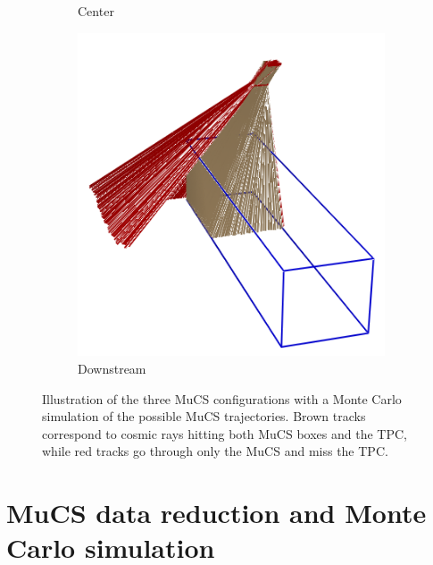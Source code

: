 \documentclass[a4paper,11pt]{article}
\begin{document}
\begin{figure}[htbp]
\begin{subfigure}{0.30\textwidth}
    \caption{Center} \label{fig:centre}
  \end{subfigure}
  \begin{subfigure}{0.30\textwidth}
    \includegraphics[width=\linewidth]{figures/downstream.png}
    \caption{Downstream} \label{fig:downstream}
  \end{subfigure}

  \caption{Illustration of the three MuCS configurations with a Monte Carlo simulation of the possible MuCS trajectories. Brown tracks correspond to cosmic rays hitting both MuCS boxes and the TPC, while red tracks go through only the MuCS and miss the TPC.} \label{fig:mucs}
\end{figure}


\section{MuCS data reduction and Monte Carlo simulation}\label{sec:merging}
\end{document}
